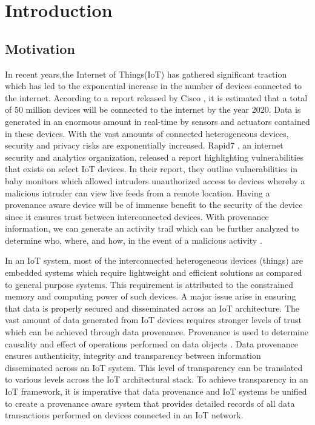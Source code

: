 \chapter{Introduction}\label{chapter:introduction}

\section{Motivation}
In recent years,the Internet of Things(IoT) has gathered significant traction which has led to the exponential increase in the number of devices connected to the internet. According to a report released by Cisco \cite{dave}, it is estimated that a total of 50 million devices will be
connected to the internet by the year 2020. Data is generated in an enormous amount in real-time by sensors and actuators contained in these devices. With the vast amounts of connected heterogeneous devices,
security and privacy risks are exponentially increased. Rapid7 \cite{rapid7}, an  internet security and analytics organization, released a report highlighting vulnerabilities that exists on select IoT devices. In their report, they outline  vulnerabilities in
baby monitors which allowed intruders unauthorized access to devices
whereby a malicious intruder can view live feeds from a remote location. Having a provenance aware device will be of immense benefit to the security of the device since it ensures trust between interconnected devices. With provenance information, we can generate an activity trail which can be further analyzed to determine who, where, and how, in the event of a malicious activity \cite{cheney_provenance_2009}. 
\par In an IoT system, most of the interconnected heterogeneous devices (things) are embedded systems which
require lightweight and efficient solutions as compared to general purpose
systems. This requirement is attributed to the constrained memory and computing power of such
devices.  A major issue arise in ensuring that data is properly secured and
disseminated across an IoT architecture. The vast amount of data generated from IoT
devices requires stronger levels of trust which can be achieved through data
provenance. Provenance is used to determine causality and effect of 
operations performed on data objects \cite{glavic_case_2011}. Data provenance ensures
authenticity, integrity and transparency between information disseminated across an
IoT system. This level of transparency can be translated to various levels across the IoT architectural stack. To achieve transparency in an IoT framework, it is imperative that data provenance and IoT systems be unified to create a provenance aware system that provides detailed records of all data
transactions performed on devices connected in an IoT network.






